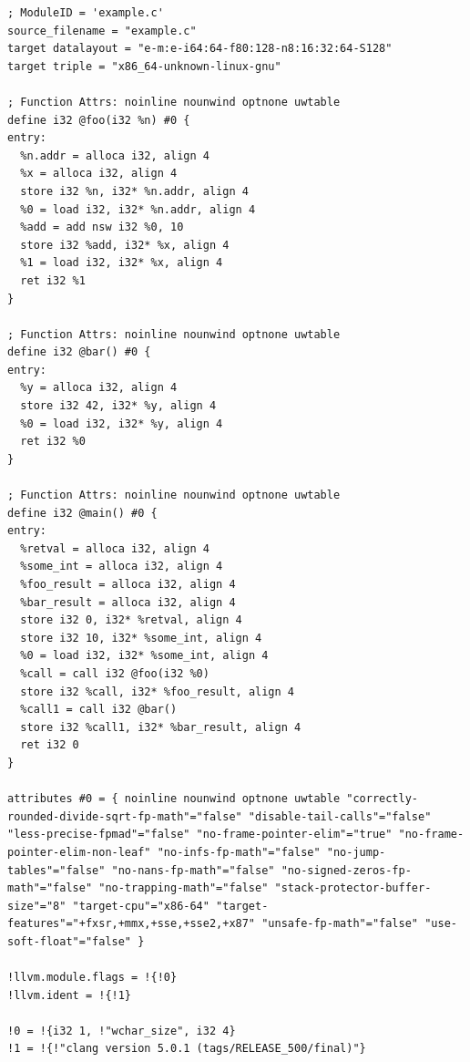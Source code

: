 \documentclass[12pt, twoside]{fithesis2}
\renewcommand{\_}{\leavevmode \kern0.07em\vbox{\hrule width0.4em}}
\begin{document}
\begin{verbatim}
; ModuleID = 'example.c'
source_filename = "example.c"
target datalayout = "e-m:e-i64:64-f80:128-n8:16:32:64-S128"
target triple = "x86_64-unknown-linux-gnu"

; Function Attrs: noinline nounwind optnone uwtable
define i32 @foo(i32 %n) #0 {
entry:
  %n.addr = alloca i32, align 4
  %x = alloca i32, align 4
  store i32 %n, i32* %n.addr, align 4
  %0 = load i32, i32* %n.addr, align 4
  %add = add nsw i32 %0, 10
  store i32 %add, i32* %x, align 4
  %1 = load i32, i32* %x, align 4
  ret i32 %1
}

; Function Attrs: noinline nounwind optnone uwtable
define i32 @bar() #0 {
entry:
  %y = alloca i32, align 4
  store i32 42, i32* %y, align 4
  %0 = load i32, i32* %y, align 4
  ret i32 %0
}

; Function Attrs: noinline nounwind optnone uwtable
define i32 @main() #0 {
entry:
  %retval = alloca i32, align 4
  %some_int = alloca i32, align 4
  %foo_result = alloca i32, align 4
  %bar_result = alloca i32, align 4
  store i32 0, i32* %retval, align 4
  store i32 10, i32* %some_int, align 4
  %0 = load i32, i32* %some_int, align 4
  %call = call i32 @foo(i32 %0)
  store i32 %call, i32* %foo_result, align 4
  %call1 = call i32 @bar()
  store i32 %call1, i32* %bar_result, align 4
  ret i32 0
}

attributes #0 = { noinline nounwind optnone uwtable "correctly-rounded-divide-sqrt-fp-math"="false" "disable-tail-calls"="false" "less-precise-fpmad"="false" "no-frame-pointer-elim"="true" "no-frame-pointer-elim-non-leaf" "no-infs-fp-math"="false" "no-jump-tables"="false" "no-nans-fp-math"="false" "no-signed-zeros-fp-math"="false" "no-trapping-math"="false" "stack-protector-buffer-size"="8" "target-cpu"="x86-64" "target-features"="+fxsr,+mmx,+sse,+sse2,+x87" "unsafe-fp-math"="false" "use-soft-float"="false" }

!llvm.module.flags = !{!0}
!llvm.ident = !{!1}

!0 = !{i32 1, !"wchar_size", i32 4}
!1 = !{!"clang version 5.0.1 (tags/RELEASE_500/final)"}
\end{verbatim}





\end{document}
